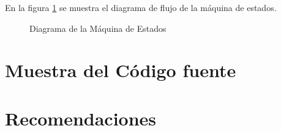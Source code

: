 En la figura \ref{fig:state_machine} se muestra el diagrama de flujo de la máquina de estados. 

\begin{figure}
\centering
\scalebox{.4}{}
\caption{Diagrama de la Máquina de Estados}
\label{fig:state_machine}
\end{figure}



\newpage
\section{Muestra del Código fuente}



\newpage
\section{Recomendaciones}


\newpage


%
%
